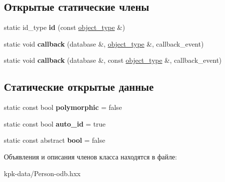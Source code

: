 \subsection*{Открытые статические члены}
\begin{DoxyCompactItemize}
\item 
static id\+\_\+type {\bfseries id} (const \hyperlink{classkpk_1_1data_1_1_person}{object\+\_\+type} \&)\hypertarget{classodb_1_1access_1_1object__traits_3_01_1_1kpk_1_1data_1_1_person_01_4_ae4ee15c20a8f513749955b81f7c5d7f1}{}\label{classodb_1_1access_1_1object__traits_3_01_1_1kpk_1_1data_1_1_person_01_4_ae4ee15c20a8f513749955b81f7c5d7f1}

\item 
static void {\bfseries callback} (database \&, \hyperlink{classkpk_1_1data_1_1_person}{object\+\_\+type} \&, callback\+\_\+event)\hypertarget{classodb_1_1access_1_1object__traits_3_01_1_1kpk_1_1data_1_1_person_01_4_a31429a5a7aa9b6e787c266c744f3035e}{}\label{classodb_1_1access_1_1object__traits_3_01_1_1kpk_1_1data_1_1_person_01_4_a31429a5a7aa9b6e787c266c744f3035e}

\item 
static void {\bfseries callback} (database \&, const \hyperlink{classkpk_1_1data_1_1_person}{object\+\_\+type} \&, callback\+\_\+event)\hypertarget{classodb_1_1access_1_1object__traits_3_01_1_1kpk_1_1data_1_1_person_01_4_a02446c553cc2f4bf6f4b08b4f37c922c}{}\label{classodb_1_1access_1_1object__traits_3_01_1_1kpk_1_1data_1_1_person_01_4_a02446c553cc2f4bf6f4b08b4f37c922c}

\end{DoxyCompactItemize}
\subsection*{Статические открытые данные}
\begin{DoxyCompactItemize}
\item 
static const bool {\bfseries polymorphic} = false\hypertarget{classodb_1_1access_1_1object__traits_3_01_1_1kpk_1_1data_1_1_person_01_4_a806697418f03f41e25eaf5359d021fa9}{}\label{classodb_1_1access_1_1object__traits_3_01_1_1kpk_1_1data_1_1_person_01_4_a806697418f03f41e25eaf5359d021fa9}

\item 
static const bool {\bfseries auto\+\_\+id} = true\hypertarget{classodb_1_1access_1_1object__traits_3_01_1_1kpk_1_1data_1_1_person_01_4_a70f701092be6a79314d87e27ae3d6fe5}{}\label{classodb_1_1access_1_1object__traits_3_01_1_1kpk_1_1data_1_1_person_01_4_a70f701092be6a79314d87e27ae3d6fe5}

\item 
static const abstract {\bfseries bool} = false\hypertarget{classodb_1_1access_1_1object__traits_3_01_1_1kpk_1_1data_1_1_person_01_4_a2d35f10e80e3a03d99b9e9cec703fcdc}{}\label{classodb_1_1access_1_1object__traits_3_01_1_1kpk_1_1data_1_1_person_01_4_a2d35f10e80e3a03d99b9e9cec703fcdc}

\end{DoxyCompactItemize}


Объявления и описания членов класса находятся в файле\+:\begin{DoxyCompactItemize}
\item 
kpk-\/data/Person-\/odb.\+hxx\end{DoxyCompactItemize}
